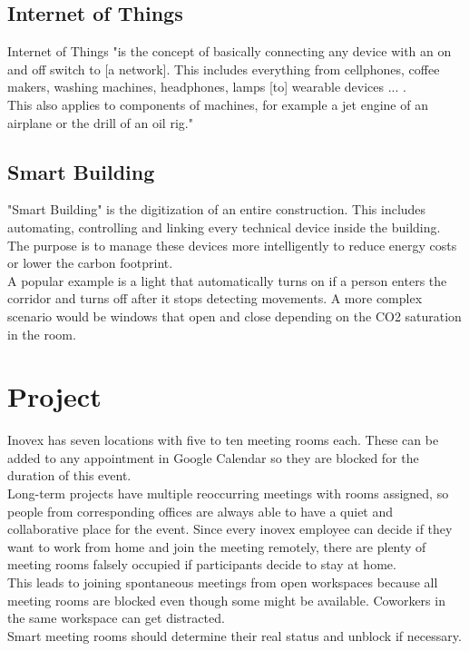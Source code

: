 \subsection{Internet of Things}
Internet of Things "is the concept of basically connecting any device with an on and off switch to [a network]. This includes everything from cellphones, coffee makers, washing machines, headphones, lamps [to] wearable devices ... .\\
This also applies to components of machines, for example a jet engine of an airplane or the drill of an oil rig."\cite{forbes-iot}

\subsection{Smart Building}
"Smart Building" is the digitization of an entire construction. This includes automating, controlling and linking every technical device inside the building. The purpose is to manage these devices more intelligently to reduce energy costs or lower the carbon footprint.\cite{kiwi-sb}\\
A popular example is a light that automatically turns on if a person enters the corridor and turns off after it stops detecting movements. A more complex scenario would be windows that open and close depending on the CO2 saturation in the room.
\newpage

\section{Project}
Inovex has seven locations with five to ten meeting rooms each. These can be added to any appointment in Google Calendar so they are blocked for the duration of this event.\\
Long-term projects have multiple reoccurring meetings with rooms assigned, so people from corresponding offices are always able to have a quiet and collaborative place for the event. Since every inovex employee can decide if they want to work from home and join the meeting remotely, there are plenty of meeting rooms falsely occupied if participants decide to stay at home.\\
This leads to joining spontaneous meetings from open workspaces because all meeting rooms are blocked even though some might be available. Coworkers in the same workspace can get distracted.\\
Smart meeting rooms should determine their real status and unblock if necessary.

